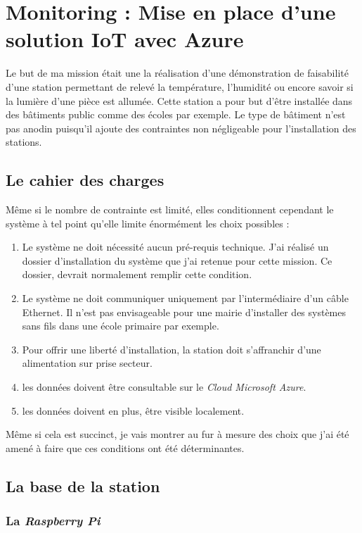 \chapter{Monitoring : Mise en place d’une solution IoT avec Azure}

Le but de ma mission était une la réalisation d'une démonstration de faisabilité d'une station permettant de relevé la température, l'humidité ou encore savoir si la lumière d'une pièce est allumée. Cette station a pour but d'être installée dans des bâtiments public comme des écoles par exemple. Le type de bâtiment n'est pas anodin puisqu'il ajoute des contraintes non négligeable pour l'installation des stations.

\section{Le cahier des charges}

Même si le nombre de contrainte est limité, elles conditionnent cependant le système à tel point qu'elle limite énormément les choix possibles :

\begin{enumerate}
\item Le système ne doit nécessité aucun pré-requis technique. J'ai réalisé un dossier d'installation du système que j'ai retenue pour cette mission. Ce dossier, devrait normalement remplir cette condition.
\item Le système ne doit communiquer uniquement par l'intermédiaire d'un câble Ethernet. Il n'est pas envisageable pour une mairie d'installer des systèmes sans fils dans une école primaire par exemple.
\item Pour offrir une liberté d'installation, la station doit s'affranchir d'une alimentation sur prise secteur.
\item les données doivent être consultable sur le \textit{Cloud Microsoft Azure}.
\item les données doivent en plus, être visible localement.
\end{enumerate}

Même si cela est succinct, je vais montrer au fur à mesure des choix que j'ai été amené à faire que ces conditions ont été déterminantes.

\section{La base de la station}
\subsection{La \textit{Raspberry Pi}}

